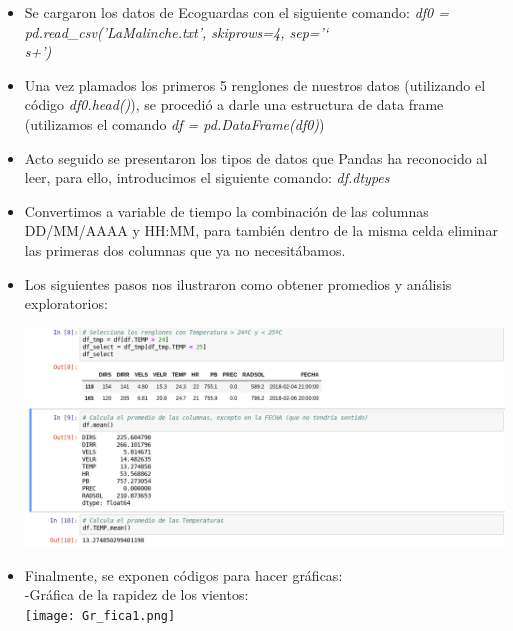 \documentclass{article}
\begin{document}
\begin{doublespace}
\begin{itemize}
\item Se cargaron los datos de Ecoguardas con el siguiente comando: 
\textit{df0 = pd.read\_csv('LaMalinche.txt', skiprows=4, sep='\char`\\ s+')}

\item Una vez plamados los primeros 5 renglones de nuestros datos (utilizando el código \textit{df0.head()}), se procedió a darle una estructura de data frame (utilizamos el comando \textit{df = pd.DataFrame(df0)}) 
\item Acto seguido se presentaron los tipos de datos que Pandas ha reconocido al leer, para ello, introducimos el siguiente comando: \textit{df.dtypes}

\item Convertimos a variable de tiempo la combinación de las columnas DD/MM/AAAA y HH:MM, para también dentro de la misma celda eliminar las primeras dos columnas que ya no necesitábamos.
\item Los siguientes pasos nos ilustraron como obtener promedios y análisis exploratorios:
\begin{center}
\includegraphics[scale=0.5]{promedios.png}
\end{center}

\item Finalmente, se exponen códigos para hacer gráficas:
\\
-Gráfica de la rapidez de los vientos:
\\
\texttt{[image: Gr\_fica1.png]}


\end{itemize}
\end{doublespace}
\end{document}
